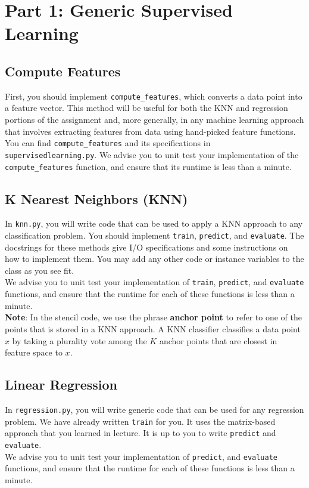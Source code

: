 \documentclass{article}
\begin{document}
\section{Part 1: Generic Supervised Learning}

\subsection{Compute Features}
First, you should implement \verb|compute_features|, which converts a data point into a feature vector.
This method will be useful for both the KNN and regression portions of the assignment and, more generally, in any machine learning approach that involves extracting features from data using hand-picked feature functions.
You can find \verb|compute_features| and its specifications in \verb|supervisedlearning.py|. We advise you to unit test your implementation of the \verb|compute_features| function, and ensure that its runtime is less than a minute.

\subsection{K Nearest Neighbors (KNN)}

In \verb|knn.py|, you will write code that can be used to apply a KNN approach to any classification problem. 
You should implement \verb|train|, \verb|predict|, and \verb|evaluate|.
The docstrings for these methods give I/O specifications and some instructions on how to implement them.
You may add any other code or instance variables to the class as you see fit. ~\\
We advise you to unit test your implementation of \verb|train|, \verb|predict|, and \verb|evaluate| functions, and ensure that the runtime for each of these functions is less than a minute.\\

\textbf{Note}: In the stencil code, we use the phrase \textbf{anchor point} to refer to one of the points that is stored in a KNN approach.
A KNN classifier classifies a data point $x$ by taking a plurality vote among the $K$ anchor points that are closest in feature space to $x$.

\subsection{Linear Regression}

In \verb|regression.py|, you will write generic code that can be used for any regression problem.
We have already written \verb|train| for you.
It uses the matrix-based approach that you learned in lecture.
It is up to you to write \verb|predict| and \verb|evaluate|.\\
We advise you to unit test your implementation of \verb|predict|, and \verb|evaluate| functions, and ensure that the runtime for each of these functions is less than a minute.
\end{document}
